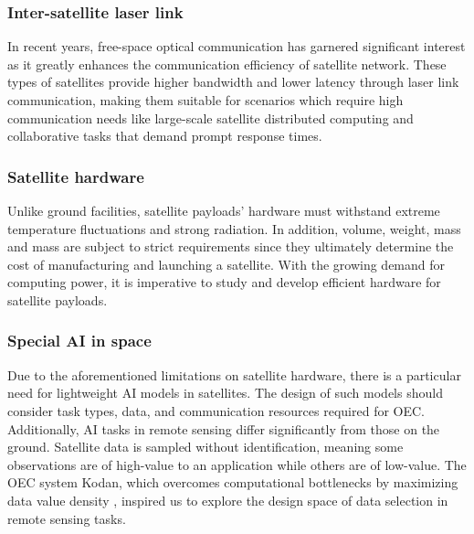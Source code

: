 \documentclass[lettersize,journal]{IEEEtran}
\begin{document}
\subsubsection*{Inter-satellite laser link}
In recent years, free-space optical communication has garnered significant interest as it greatly enhances the communication efficiency of satellite network. These types of satellites provide higher bandwidth and lower latency through laser link communication, making them suitable for scenarios which require high communication needs like large-scale satellite distributed computing and collaborative tasks that demand prompt response times.

\subsubsection*{Satellite hardware} Unlike ground facilities, satellite payloads' hardware must withstand extreme temperature fluctuations and strong radiation. In addition, volume, weight, mass and mass are subject to strict requirements since they ultimately determine the cost of manufacturing and launching a satellite. With the growing demand for computing power, it is imperative to study and develop efficient hardware for satellite payloads.

\subsubsection*{Special AI in space} Due to the aforementioned limitations on satellite hardware, there is a particular need for lightweight AI models in satellites. The design of such models should consider task types, data, and communication resources required for OEC. Additionally, AI tasks in remote sensing differ significantly from those on the ground. Satellite data is sampled without identification, meaning some observations are of high-value to an application while others are of low-value. The OEC system Kodan, which overcomes computational bottlenecks by maximizing data value density \cite{denby2023kodan}, inspired us to explore the design space of data selection in remote sensing tasks.
\end{document}
